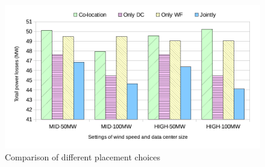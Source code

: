 \begin{figure}[ht]
\centering
\includegraphics[width=1\columnwidth]{img/joint_loss}
\caption{Comparison of different placement choices}
\label{fig:joint_loss}
\end{figure}




